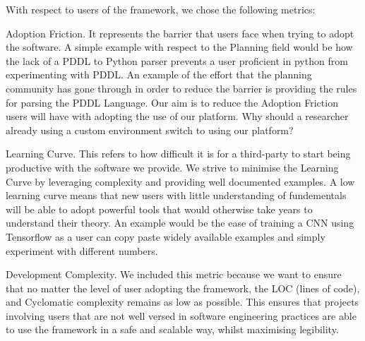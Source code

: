With respect to users of the framework, we chose the following metrics:

Adoption Friction.
It represents the barrier that users face when trying to adopt the software.
A simple example with respect to the Planning field would be how the lack of a PDDL to Python parser prevents a user proficient in python from experimenting with PDDL.
An example of the effort that the planning community has gone through in order to reduce the barrier is providing the rules for parsing the PDDL Language.
Our aim is to reduce the Adoption Friction users will have with adopting the use of our platform.
Why should a researcher already using a custom environment switch to using our platform?

Learning Curve.
This refers to how difficult it is for a third-party to start being productive with the software we provide.
We strive to minimise the Learning Curve by leveraging complexity and providing well documented examples.
A low learning curve means that new users with little understanding of fundementals will be able to adopt powerful tools that would otherwise take years to understand their theory.
An example would be the ease of training a CNN using Tensorflow as a user can copy paste widely available examples and simply experiment with different numbers.

Development Complexity.
We included this metric because we want to ensure that no matter the level of user adopting the framework, the LOC (lines of code), and Cyclomatic complexity remains as low as possible.
This ensures that projects involving users that are not well versed in software engineering practices are able to use the framework in a safe and scalable way, whilst maximising legibility.


